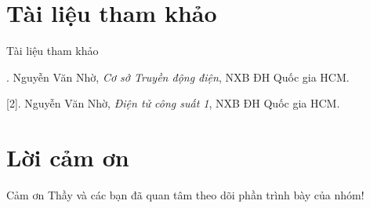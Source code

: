 \documentclass[24pt]{beamer}
\begin{document}
\section*{Tài liệu tham khảo}
\begin{frame}{Tài liệu tham khảo}
\begin{small}
\justifying
[1]. Nguyễn Văn Nhờ, \textit{Cơ sở Truyền động điện}, NXB ĐH Quốc gia HCM.

[2]. Nguyễn Văn Nhờ, \textit{Điện tử công suất 1}, NXB ĐH Quốc gia HCM.
\end{small}
\end{frame}
\section*{Lời cảm ơn}
\begin{frame}
\justifying
\large \alert{Cảm ơn Thầy và các bạn đã quan tâm theo dõi phần trình bày của nhóm!}
\end{frame}
\end{document}
